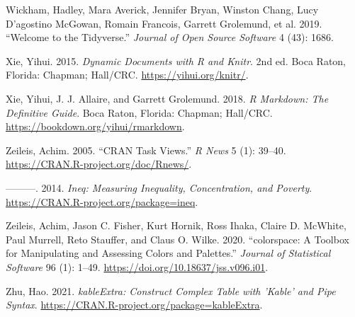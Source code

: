 \documentclass{article}
\newlength{\cslhangindent}
\newlength{\cslentryspacingunit} %
\newenvironment{CSLReferences}[2] %
 {%
  \setlength{\parindent}{0pt}
  \ifodd #1
  \let\oldpar\par
  \def\par{\hangindent=\cslhangindent\oldpar}
  \fi
  \setlength{\parskip}{#2\cslentryspacingunit}
 }%
 {}
\begin{document}
\begin{CSLReferences}{1}{0}
\leavevmode{}%
Wickham, Hadley, Mara Averick, Jennifer Bryan, Winston Chang, Lucy
D'agostino McGowan, Romain Francois, Garrett Grolemund, et al. 2019.
{``Welcome to the Tidyverse.''} \emph{Journal of Open Source Software} 4
(43): 1686.

\leavevmode{}%
Xie, Yihui. 2015. \emph{Dynamic Documents with {R} and Knitr}. 2nd ed.
Boca Raton, Florida: Chapman; Hall/CRC. \url{https://yihui.org/knitr/}.

\leavevmode{}%
Xie, Yihui, J. J. Allaire, and Garrett Grolemund. 2018. \emph{R
Markdown: The Definitive Guide}. Boca Raton, Florida: Chapman; Hall/CRC.
\url{https://bookdown.org/yihui/rmarkdown}.

\leavevmode{}%
Zeileis, Achim. 2005. {``{CRAN} Task Views.''} \emph{R News} 5 (1):
39--40. \url{https://CRAN.R-project.org/doc/Rnews/}.

\leavevmode{}%
---------. 2014. \emph{Ineq: Measuring Inequality, Concentration, and
Poverty}. \url{https://CRAN.R-project.org/package=ineq}.

\leavevmode{}%
Zeileis, Achim, Jason C. Fisher, Kurt Hornik, Ross Ihaka, Claire D.
McWhite, Paul Murrell, Reto Stauffer, and Claus O. Wilke. 2020.
{``{colorspace}: A Toolbox for Manipulating and Assessing Colors and
Palettes.''} \emph{Journal of Statistical Software} 96 (1): 1--49.
\url{https://doi.org/10.18637/jss.v096.i01}.

\leavevmode{}%
Zhu, Hao. 2021. \emph{kableExtra: Construct Complex Table with 'Kable'
and Pipe Syntax}. \url{https://CRAN.R-project.org/package=kableExtra}.

\end{CSLReferences}



\end{document}
